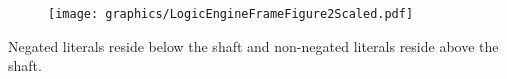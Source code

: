 \begin{figure}[!h]
\begin{center}
\texttt{[image: graphics/LogicEngineFrameFigure2Scaled.pdf]}
\caption{}\label{fig:LogicEngineFrameFigure2.pdf}
\end{center}
\end{figure}

Negated literals reside below the shaft and non-negated literals reside above the shaft.

